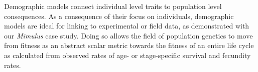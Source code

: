 \documentclass[11pt]{article}
\begin{document}
Demographic models connect individual level traits to population level consequences. As a consequence of their focus on individuals, demographic models are ideal for linking to experimental or field data, as demonstrated with our \textit{Mimulus} case study. Doing so allows the field of population genetics to move from fitness as an abstract scalar metric towards the fitness of an entire life cycle as calculated from observed rates of age- or stage-specific survival and fecundity rates.  



 












\newpage{}


\end{document}
